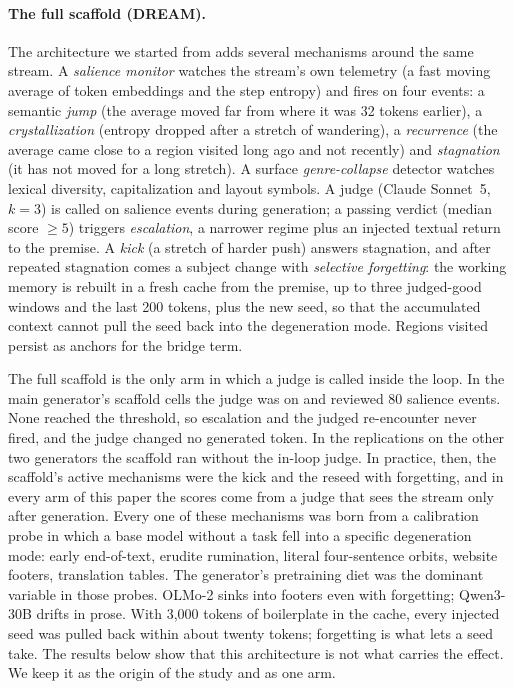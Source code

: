 \paragraph{The full scaffold (DREAM).} The architecture we started from adds
several mechanisms around the same stream. A \emph{salience monitor} watches
the stream's own telemetry (a fast moving average of token embeddings and
the step entropy) and fires on four events: a semantic \emph{jump} (the
average moved far from where it was 32 tokens earlier), a
\emph{crystallization} (entropy dropped after a stretch of wandering), a
\emph{recurrence} (the average came close to a region visited long ago and
not recently) and \emph{stagnation} (it has not moved for a long stretch). A
surface \emph{genre-collapse} detector watches lexical diversity,
capitalization and layout symbols. A judge (Claude Sonnet~5, $k=3$) is
called on salience events during generation; a passing verdict (median
score $\ge 5$) triggers \emph{escalation}, a narrower regime plus an
injected textual return to the premise. A \emph{kick} (a stretch of harder
push) answers stagnation, and after repeated stagnation comes a subject
change with \emph{selective forgetting}: the working memory is rebuilt in a
fresh cache from the premise, up to three judged-good windows and the last
200 tokens, plus the new seed, so that the accumulated context cannot pull
the seed back into the degeneration mode. Regions visited persist as anchors
for the bridge term.

The full scaffold is the only arm in which a judge is called inside the
loop. In the main generator's scaffold cells the judge was on and reviewed
80 salience events. None reached the threshold, so escalation and the judged
re-encounter never fired, and the judge changed no generated token. In the
replications on the other two generators the scaffold ran without the
in-loop judge. In practice, then, the scaffold's active mechanisms were the
kick and the reseed with forgetting, and in every arm of this paper the
scores come from a judge that sees the stream only after generation. Every
one of these mechanisms was born from a calibration probe in which a base
model without a task fell into a specific degeneration mode: early
end-of-text, erudite rumination, literal four-sentence orbits, website
footers, translation tables. The generator's pretraining diet was the
dominant variable in those probes. OLMo-2 sinks into footers even with
forgetting; Qwen3-30B drifts in prose. With 3,000 tokens of boilerplate in
the cache, every injected seed was pulled back within about twenty tokens;
forgetting is what lets a seed take. The results below show that this
architecture is not what carries the effect. We keep it as the origin of the
study and as one arm.

